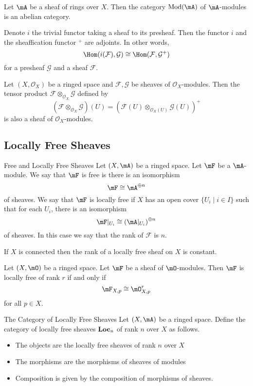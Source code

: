 \documentclass[a4paper]{article}
\begin{document}
\begin{thm}{}{} Let $\mA$ be a sheaf of rings over $X$. Then the category $\text{Mod}(\mA)$ of $\mA$-modules is an abelian category. 
\end{thm}

\begin{prp}{}{} Denote $i$ the trivial functor taking a sheaf to its presheaf. Then the functor $i$ and the sheaffication functor $^+$ are adjoints. In other words, $$\Hom(i(\mathcal{F}),\mathcal{G})\cong\Hom(\mathcal{F},\mathcal{G}^+)$$ for a presheaf $\mathcal{G}$ and a sheaf $\mathcal{F}$. 
\end{prp}

\begin{prp}{}{} Let $(X,\mathcal{O}_X)$ be a ringed space and $\mathcal{F},\mathcal{G}$ be sheaves of $\mathcal{O}_X$-modules. Then the tensor product $\mathcal{F}\otimes_{\mathcal{O}_X}\mathcal{G}$ defined by $$(\mathcal{F}\otimes_{\mathcal{O}_X}\mathcal{G})(U)=(\mathcal{F}(U)\otimes_{\mathcal{O}_X(U)}\mathcal{G}(U))^+$$ is also a sheaf of $\mathcal{O}_X$-modules. 
\end{prp}

\subsection{Locally Free Sheaves}
\begin{defn}{Free and Locally Free Sheaves}{} Let $(X,\mA)$ be a ringed space. Let $\mF$ be a $\mA$-module. We say that $\mF$ is free is there is an isomorphism $$\mF\cong\mA^{\oplus n}$$ of sheaves. We say that $\mF$ is locally free if $X$ has an open cover $\{U_i\;|\;i\in I\}$ such that for each $U_i$, there is an isomorphism $$\mF|_{U_i}\cong\left(\mA|_{U_i}\right)^{\oplus n}$$ of sheaves. In this case we say that the rank of $\mathcal{F}$ is $n$. 
\end{defn}

\begin{lmm}{}{} If $X$ is connected then the rank of a locally free sheaf on $X$ is constant. 
\end{lmm}

\begin{prp}{}{} Let $(X,\mO)$ be a ringed space. Let $\mF$ be a sheaf of $\mO$-modules. Then $\mF$ is locally free of rank $r$ if and only if $$\mF_{X,p}\cong\mO_{X,p}^r$$ for all $p\in X$. 
\end{prp}

\begin{defn}{The Category of Locally Free Sheaves}{} Let $(X,\mA)$ be a ringed space. Define the category of locally free sheaves $\bold{Loc}_n$ of rank $n$ over $X$ as follows. 
\begin{itemize}
\item The objects are the locally free sheaves of rank $n$ over $X$
\item The morphisms are the morphisms of sheaves of modules
\item Composition is given by the composition of morphisms of sheaves. 
\end{itemize}
\end{defn}
\end{document}
